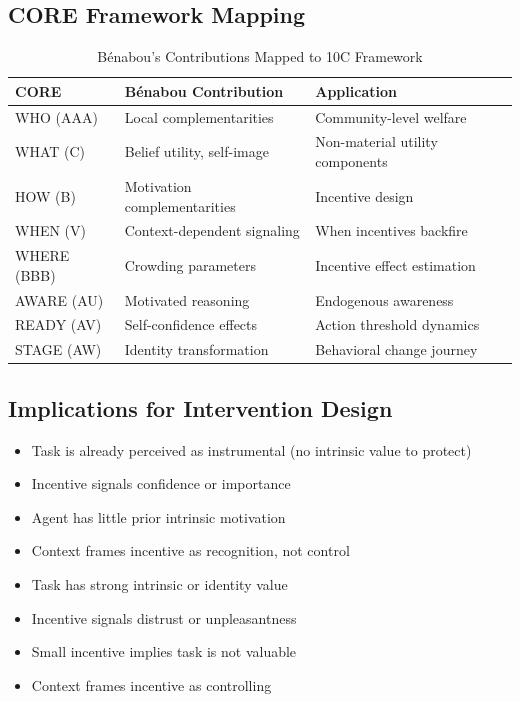 \subsection{CORE Framework Mapping}

\begin{table}[htbp]
\centering
\caption{Bénabou's Contributions Mapped to 10C Framework}
\label{tab:rb-9c-mapping}
\begin{tabular}{lll}
\toprule
\textbf{CORE} & \textbf{Bénabou Contribution} & \textbf{Application} \\
\midrule
WHO (AAA) & Local complementarities & Community-level welfare \\
WHAT (C) & Belief utility, self-image & Non-material utility components \\
HOW (B) & Motivation complementarities & Incentive design \\
WHEN (V) & Context-dependent signaling & When incentives backfire \\
WHERE (BBB) & Crowding parameters & Incentive effect estimation \\
AWARE (AU) & Motivated reasoning & Endogenous awareness \\
READY (AV) & Self-confidence effects & Action threshold dynamics \\
STAGE (AW) & Identity transformation & Behavioral change journey \\
\bottomrule
\end{tabular}
\end{table}

\subsection{Implications for Intervention Design}

\begin{tcolorbox}[colback=green!5!white,colframe=green!75!black,title=When Incentives Work]
\begin{itemize}
    \item Task is already perceived as instrumental (no intrinsic value to protect)
    \item Incentive signals confidence or importance
    \item Agent has little prior intrinsic motivation
    \item Context frames incentive as recognition, not control
\end{itemize}
\end{tcolorbox}

\begin{tcolorbox}[colback=red!5!white,colframe=red!75!black,title=When Incentives Backfire]
\begin{itemize}
    \item Task has strong intrinsic or identity value
    \item Incentive signals distrust or unpleasantness
    \item Small incentive implies task is not valuable
    \item Context frames incentive as controlling
\end{itemize}
\end{tcolorbox}


